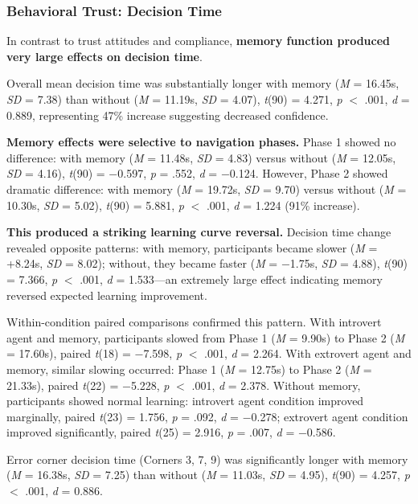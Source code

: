 \documentclass[12pt]{article}
\begin{document}
\subsubsection{Behavioral Trust: Decision Time}

In contrast to trust attitudes and compliance, \textbf{memory function produced very large effects on decision time}.

Overall mean decision time was substantially longer with memory (\textit{M} = 16.45s, \textit{SD} = 7.38) than without (\textit{M} = 11.19s, \textit{SD} = 4.07), \textit{t}(90) = 4.271, \textit{p} $<$ .001, \textit{d} = 0.889, representing 47\% increase suggesting decreased confidence.

\textbf{Memory effects were selective to navigation phases.} Phase 1 showed no difference: with memory (\textit{M} = 11.48s, \textit{SD} = 4.83) versus without (\textit{M} = 12.05s, \textit{SD} = 4.16), \textit{t}(90) = $-$0.597, \textit{p} = .552, \textit{d} = $-$0.124. However, Phase 2 showed dramatic difference: with memory (\textit{M} = 19.72s, \textit{SD} = 9.70) versus without (\textit{M} = 10.30s, \textit{SD} = 5.02), \textit{t}(90) = 5.881, \textit{p} $<$ .001, \textit{d} = 1.224 (91\% increase).

\textbf{This produced a striking learning curve reversal.} Decision time change revealed opposite patterns: with memory, participants became slower (\textit{M} = +8.24s, \textit{SD} = 8.02); without, they became faster (\textit{M} = $-$1.75s, \textit{SD} = 4.88), \textit{t}(90) = 7.366, \textit{p} $<$ .001, \textit{d} = 1.533---an extremely large effect indicating memory reversed expected learning improvement.

Within-condition paired comparisons confirmed this pattern. With introvert agent and memory, participants slowed from Phase 1 (\textit{M} = 9.90s) to Phase 2 (\textit{M} = 17.60s), paired \textit{t}(18) = $-$7.598, \textit{p} $<$ .001, \textit{d} = 2.264. With extrovert agent and memory, similar slowing occurred: Phase 1 (\textit{M} = 12.75s) to Phase 2 (\textit{M} = 21.33s), paired \textit{t}(22) = $-$5.228, \textit{p} $<$ .001, \textit{d} = 2.378. Without memory, participants showed normal learning: introvert agent condition improved marginally, paired \textit{t}(23) = 1.756, \textit{p} = .092, \textit{d} = $-$0.278; extrovert agent condition improved significantly, paired \textit{t}(25) = 2.916, \textit{p} = .007, \textit{d} = $-$0.586.

Error corner decision time (Corners 3, 7, 9) was significantly longer with memory (\textit{M} = 16.38s, \textit{SD} = 7.25) than without (\textit{M} = 11.03s, \textit{SD} = 4.95), \textit{t}(90) = 4.257, \textit{p} $<$ .001, \textit{d} = 0.886.
\end{document}
